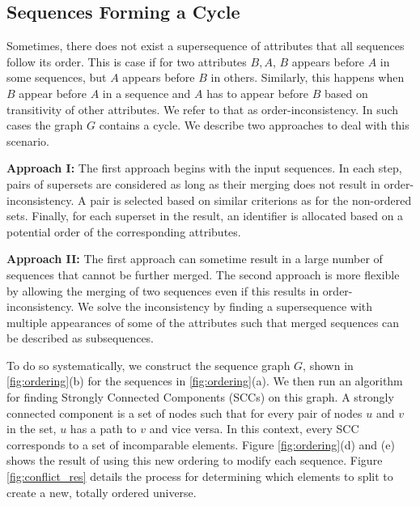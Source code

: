 \subsection{Sequences Forming a Cycle}
Sometimes, there does not exist a supersequence of attributes that all sequences follow its order. This is case  if for two attributes $B, A$,  $B$ appears before $A$ in some sequences, but $A$ appears before $B$ in others. Similarly, this happens when $B$ appear before $A$ in a sequence and $A$ has to appear before $B$ based on transitivity of other attributes. We refer to that as order-inconsistency.  In such cases the graph $G$ contains a cycle. We describe two approaches to deal with this scenario. 

\textbf{Approach I:} The first approach begins with the input sequences. In each step, pairs of supersets are considered as long as their merging does not result in order-inconsistency. A pair is selected based on similar criterions as for the non-ordered sets. Finally, for each superset in the result, an identifier is allocated based on a potential order of the corresponding attributes.

\textbf{Approach II:} The first approach can sometime result in a large number of sequences that cannot be further merged. The second approach is more flexible by allowing the merging of two sequences even if this results in order-inconsistency. We solve the inconsistency by finding a supersequence with multiple appearances of some of the attributes such that merged sequences can be described as subsequences. 

To do so systematically, we construct the sequence graph $G$, shown in \ref{fig:ordering}(b) for the sequences  in \ref{fig:ordering}(a). We then run an algorithm for finding Strongly Connected Components (SCCs) on this graph. A strongly connected component is a set of nodes such that for every pair of nodes $u$ and $v$ in the set, $u$ has a path to $v$ and vice versa. In this context, every SCC corresponds to a set of incomparable elements.  Figure \ref{fig:ordering}(d) and (e) shows the result of using this new ordering to modify each sequence.  
Figure \ref{fig:conflict_res} details the process for determining which elements to split to create a new, totally ordered universe.


